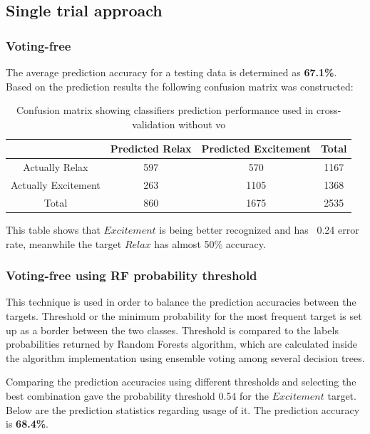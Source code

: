 \documentclass[12pt]{article}
\begin{document}
\subsection{Single trial approach}

\subsubsection{Voting-free}

The average prediction accuracy for a testing data is determined as \textbf{67.1\%}. Based on the prediction results the following confusion matrix was constructed:
\begin{table}[H]
\caption{Confusion matrix showing classifiers prediction performance used in cross-validation without vo} \label{tab:title} 
\begin{center}
  \begin{tabular}{ | c | c | c | c | }
    \hline
     & Predicted Relax & Predicted Excitement & Total \\ \hline
    Actually Relax & 597 & 570 & 1167 \\ \hline
    Actually Excitement & 263 & 1105 & 1368 \\ \hline
    Total & 860 & 1675 & 2535 \\ 
    \hline
  \end{tabular}
\end{center}
\end{table}

This table shows that $Excitement$ is being better recognized and has ~0.24 error rate, meanwhile the target $Relax$ has almost 50\% accuracy.

\subsubsection{Voting-free using RF probability threshold}

This technique is used in order to balance the prediction accuracies between the targets. Threshold or the minimum probability for the most frequent target is set up as a border between the two classes. Threshold is compared to the labels probabilities returned by Random Forests algorithm, which are calculated inside the algorithm implementation using ensemble voting among several decision trees. 

Comparing the prediction accuracies using different thresholds and selecting the best combination gave the probability threshold 0.54 for the $Excitement$ target. Below are the prediction statistics regarding usage of it. The prediction accuracy is \textbf{68.4\%}.
\end{document}
